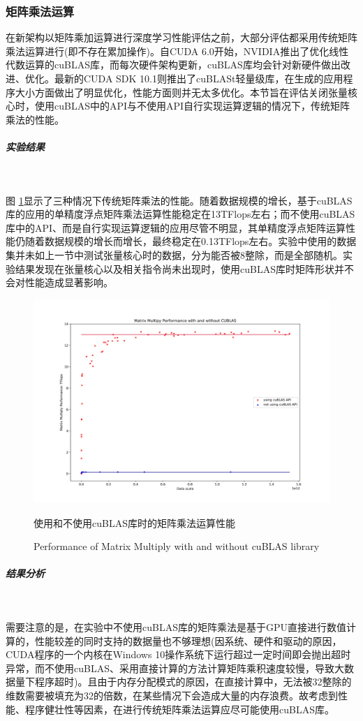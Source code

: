 \subsubsection{矩阵乘法运算}
\par 在新架构以矩阵乘加运算进行深度学习性能评估之前，大部分评估都采用传统矩阵乘法运算进行(即不存在累加操作)。自CUDA 6.0开始，NVIDIA推出了优化线性代数运算的cuBLAS库，而每次硬件架构更新，cuBLAS库均会针对新硬件做出改进、优化。最新的CUDA SDK 10.1则推出了cuBLASt轻量级库，在生成的应用程序大小方面做出了明显优化，性能方面则并无太多优化。本节旨在评估关闭张量核心时，使用cuBLAS中的API与不使用API自行实现运算逻辑的情况下，传统矩阵乘法的性能。
\subparagraph{实验结果}~{}
\par 图 \ref{Fig.CUBLASPerf}显示了三种情况下传统矩阵乘法的性能。随着数据规模的增长，基于cuBLAS库的应用的单精度浮点矩阵乘法运算性能稳定在13TFlops左右；而不使用cuBLAS库中的API、而是自行实现运算逻辑的应用尽管不明显，其单精度浮点矩阵运算性能仍随着数据规模的增长而增长，最终稳定在0.13TFlops左右。实验中使用的数据集并未如上一节中测试张量核心时的数据，分为能否被8整除，而是全部随机。实验结果发现在张量核心以及相关指令尚未出现时，使用cuBLAS库时矩阵形状并不会对性能造成显著影响。
\begin{figure}
	\centering
	\includegraphics[width=15cm]{figures/CUBLASPerf.jpg}
	\renewcommand{\thefigure}{\arabic{section}-\arabic{figure} }
	\renewcommand{\figurename}{图}
	\caption{使用和不使用cuBLAS库时的矩阵乘法运算性能}
	\addtocounter{figure}{-1}
	\renewcommand{\thefigure}{\arabic{section}-\arabic{figure} }
	\renewcommand{\figurename}{Figure}
	\caption{Performance of Matrix Multiply with and without cuBLAS library}
	\label{Fig.CUBLASPerf}
\end{figure}
\subparagraph{结果分析}~{}
\par 需要注意的是，在实验中不使用cuBLAS库的矩阵乘法是基于GPU直接进行数值计算的，性能较差的同时支持的数据量也不够理想(因系统、硬件和驱动的原因，CUDA程序的一个内核在Windows 10操作系统下运行超过一定时间即会抛出超时异常，而不使用cuBLAS、采用直接计算的方法计算矩阵乘积速度较慢，导致大数据量下程序超时)。且由于内存分配模式的原因，在直接计算中，无法被32整除的维数需要被填充为32的倍数，在某些情况下会造成大量的内存浪费。故考虑到性能、程序健壮性等因素，在进行传统矩阵乘法运算应尽可能使用cuBLAS库。

